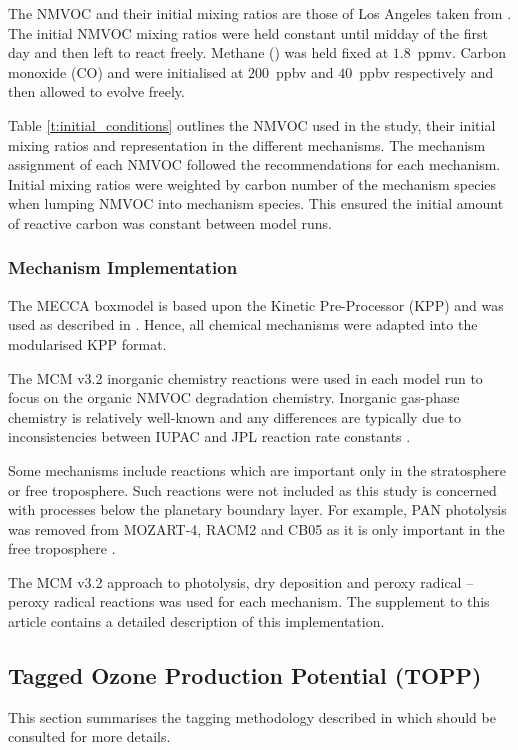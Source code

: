 The NMVOC and their initial mixing ratios are those of Los Angeles taken from \citet{Baker:2008}. 
The initial NMVOC mixing ratios were held constant until midday of the first day and then left to react freely. 
Methane () was held fixed at \mbox{$1.8$ ppmv}. 
Carbon monoxide (CO) and  were initialised at \mbox{$200$ ppbv} and \mbox{$40$ ppbv} respectively and then allowed to evolve freely.

Table \ref{t:initial_conditions} outlines the NMVOC used in the study, their initial mixing ratios and representation in the different mechanisms.
The mechanism assignment of each NMVOC followed the recommendations for each mechanism.
Initial mixing ratios were weighted by carbon number of the mechanism species when lumping NMVOC into mechanism species. 
This ensured the initial amount of reactive carbon was constant between model runs.

\subsubsection{Mechanism Implementation} %

The MECCA boxmodel \citep{Sander:2005} is based upon the Kinetic Pre-Processor (KPP) \citep{Damian:2002} and was used as described in \citet{Butler:2011}. 
Hence, all chemical mechanisms were adapted into the modularised KPP format.

The MCM v3.2 inorganic chemistry reactions were used in each model run to focus on the organic NMVOC degradation chemistry.
Inorganic gas-phase chemistry is relatively well-known and any differences are typically due to inconsistencies between IUPAC and JPL reaction rate constants \citep{Emmerson:2009}.

Some mechanisms include reactions which are important only in the stratosphere or free troposphere. 
Such reactions were not included as this study is concerned with processes below the planetary boundary layer. 
For example, PAN photolysis was removed from MOZART-4, RACM2 and CB05 as it is only important in the free troposphere \citep{Harwood:2003}.  

The MCM v3.2 approach to photolysis, dry deposition and peroxy radical -- peroxy radical reactions was used for each mechanism. 
The supplement to this article contains a detailed description of this implementation.

\subsection{Tagged Ozone Production Potential (TOPP)}
This section summarises the tagging methodology described in \citet{Butler:2011} which should be consulted for more details.

